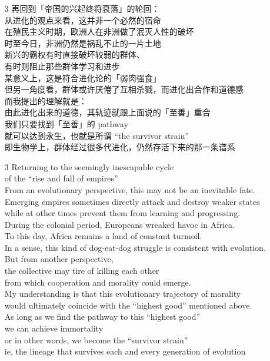 \begin{itemize}
	\item[3] 再回到「帝国的兴起终将衰落」的轮回： \\
	从进化的观点来看，这并非一个必然的宿命 \\
	在殖民主义时期，欧洲人在非洲做了泯灭人性的破坏 \\
	时至今日，非洲仍然是祸乱不止的一片土地 \\
	新兴的霸权有时直接破坏较弱的群体、\\
	有时则阻止那些群体学习和进步 \\
	某意义上，这是符合进化论的「弱肉强食」 \\
	但另一角度看，群体或许厌倦了互相杀戮，而进化出合作和道德感 \\
	而我提出的理解就是： \\
	由此进化出来的道德，其轨迹就跟上面说的「至善」重合 \\
	我们只要找到「至善」的 pathway \\
	就可以达到永生，也就是所谓 “the survivor strain” \\
	即生物学上，群体经过很多代进化，仍然存活下来的那一条谱系

	\item[3] Returning to the seemingly inescapable cycle \\
	of the ``rise and fall of empires'' \\
	From an evolutionary perspective, this may not be an inevitable fate. \\
	Emerging empires sometimes directly attack and destroy weaker states \\
	while at other times prevent them from learning and progressing. \\
	During the colonial period, Europeans wreaked havoc in Africa. \\
	To this day, Africa remains a land of constant turmoil. \\
	In a sense, this kind of dog-eat-dog struggle is consistent with evolution. \\
	But from another perspective, \\
	the collective may tire of killing each other \\
	from which cooperation and morality could emerge. \\
	My understanding is that this evolutionary trajectory of morality \\
	would ultimately coincide with the ``highest good'' mentioned above. \\
	As long as we find the pathway to this ``highest good'' \\
	we can achieve immortality \\
	or in other words, we become the ``survivor strain'' \\
	ie, the lineage that survives each and every generation of evolution


\end{itemize}
